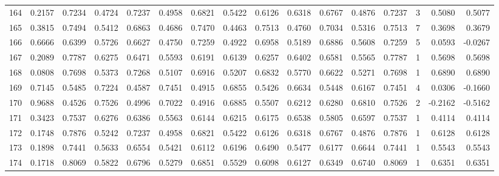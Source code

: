 \begin{tabular}{lrrrrrrrrrrrrrrr}
164 &      0.2157 &  0.7234 &  0.4724 &  0.7237 &  0.4958 &  0.6821 &  0.5422 &  0.6126 &  0.6318 &  0.6767 &   0.4876 &     0.7237 &      3 &                    0.5080 &                     0.5077 \\
165 &      0.3815 &  0.7494 &  0.5412 &  0.6863 &  0.4686 &  0.7470 &  0.4463 &  0.7513 &  0.4760 &  0.7034 &   0.5316 &     0.7513 &      7 &                    0.3698 &                     0.3679 \\
166 &      0.6666 &  0.6399 &  0.5726 &  0.6627 &  0.4750 &  0.7259 &  0.4922 &  0.6958 &  0.5189 &  0.6886 &   0.5608 &     0.7259 &      5 &                    0.0593 &                    -0.0267 \\
167 &      0.2089 &  0.7787 &  0.6275 &  0.6471 &  0.5593 &  0.6191 &  0.6139 &  0.6257 &  0.6402 &  0.6581 &   0.5565 &     0.7787 &      1 &                    0.5698 &                     0.5698 \\
168 &      0.0808 &  0.7698 &  0.5373 &  0.7268 &  0.5107 &  0.6916 &  0.5207 &  0.6832 &  0.5770 &  0.6622 &   0.5271 &     0.7698 &      1 &                    0.6890 &                     0.6890 \\
169 &      0.7145 &  0.5485 &  0.7224 &  0.4587 &  0.7451 &  0.4915 &  0.6855 &  0.5426 &  0.6634 &  0.5448 &   0.6167 &     0.7451 &      4 &                    0.0306 &                    -0.1660 \\
170 &      0.9688 &  0.4526 &  0.7526 &  0.4996 &  0.7022 &  0.4916 &  0.6885 &  0.5507 &  0.6212 &  0.6280 &   0.6810 &     0.7526 &      2 &                   -0.2162 &                    -0.5162 \\
171 &      0.3423 &  0.7537 &  0.6276 &  0.6386 &  0.5563 &  0.6144 &  0.6215 &  0.6175 &  0.6538 &  0.5805 &   0.6597 &     0.7537 &      1 &                    0.4114 &                     0.4114 \\
172 &      0.1748 &  0.7876 &  0.5242 &  0.7237 &  0.4958 &  0.6821 &  0.5422 &  0.6126 &  0.6318 &  0.6767 &   0.4876 &     0.7876 &      1 &                    0.6128 &                     0.6128 \\
173 &      0.1898 &  0.7441 &  0.5633 &  0.6554 &  0.5421 &  0.6112 &  0.6196 &  0.6490 &  0.5477 &  0.6177 &   0.6644 &     0.7441 &      1 &                    0.5543 &                     0.5543 \\
174 &      0.1718 &  0.8069 &  0.5822 &  0.6796 &  0.5279 &  0.6851 &  0.5529 &  0.6098 &  0.6127 &  0.6349 &   0.6740 &     0.8069 &      1 &                    0.6351 &                     0.6351 \\

\end{tabular}
